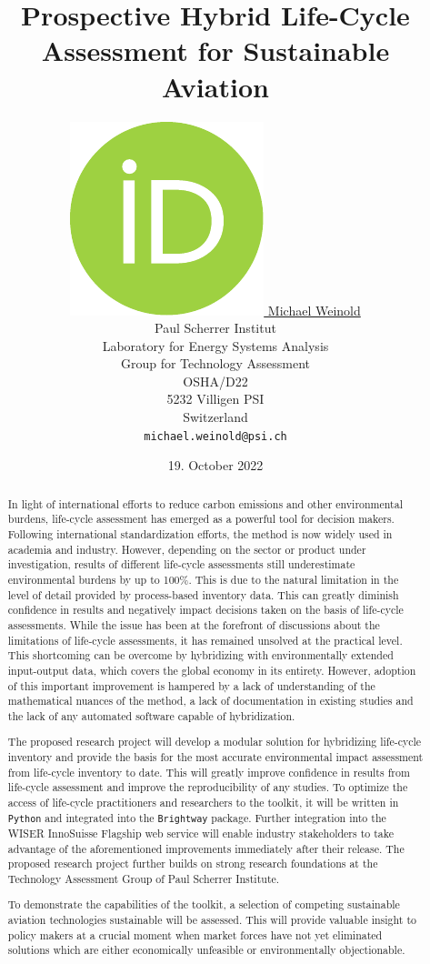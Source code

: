 \documentclass{article}
\title{Prospective Hybrid Life-Cycle Assessment \newline for Sustainable Aviation}
\author{
    \href{https://orcid.org/0000-0003-4859-2650}
    {\includegraphics[scale=0.06]{auxiliary/figures/orcid.pdf}
    \hspace{1mm}
    Michael Weinold} \\
	Paul Scherrer Institut\\
	Laboratory for Energy Systems Analysis\\
	Group for Technology Assessment\\
	OSHA/D22\\
    5232 Villigen PSI \\
    Switzerland \\
	\texttt{michael.weinold@psi.ch} \\
}
\date{19. October 2022}
\begin{document}


\maketitle

\begin{abstract}

    In light of international efforts to reduce carbon emissions and other environmental burdens, life-cycle assessment has emerged as a powerful tool for decision makers. Following international standardization efforts, the method is now widely used in academia and industry. However, depending on the sector or product under investigation, results of different life-cycle assessments still underestimate environmental burdens by up to 100\%. This is due to the natural limitation in the level of detail provided by process-based inventory data. This can greatly diminish confidence in results and negatively impact decisions taken on the basis of life-cycle assessments. While the issue has been at the forefront of discussions about the limitations of life-cycle assessments, it has remained unsolved at the practical level. This shortcoming can be overcome by hybridizing with environmentally extended input-output data, which covers the global economy in its entirety. However, adoption of this important improvement is hampered by a lack of understanding of the mathematical nuances of the method, a lack of documentation in existing studies and the lack of any automated software capable of hybridization.
    
    The proposed research project will develop a modular solution for hybridizing life-cycle inventory and provide the basis for the most accurate environmental impact assessment from life-cycle inventory to date. This will greatly improve confidence in results from life-cycle assessment and improve the reproducibility of any studies. To optimize the access of life-cycle practitioners and researchers to the toolkit, it will be written in \texttt{Python} and integrated into the \texttt{Brightway} package. Further integration into the WISER InnoSuisse Flagship web service will enable industry stakeholders to take advantage of the aforementioned improvements immediately after their release. The proposed research project further builds on strong research foundations at the Technology Assessment Group of Paul Scherrer Institute.
    
    To demonstrate the capabilities of the toolkit, a selection of competing sustainable aviation technologies sustainable will be assessed. This will provide valuable insight to policy makers at a crucial moment when market forces have not yet eliminated solutions which are either economically unfeasible or environmentally objectionable. 
	
\end{abstract}
\end{document}
